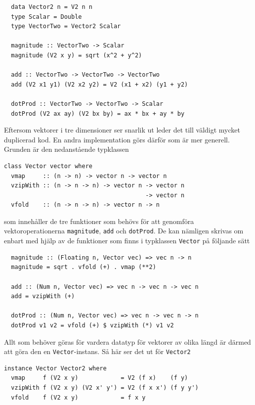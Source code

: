 \begin{lstlisting}
  data Vector2 n = V2 n n
  type Scalar = Double
  type VectorTwo = Vector2 Scalar
  
  magnitude :: VectorTwo -> Scalar
  magnitude (V2 x y) = sqrt (x^2 + y^2)
  
  add :: VectorTwo -> VectorTwo -> VectorTwo
  add (V2 x1 y1) (V2 x2 y2) = V2 (x1 + x2) (y1 + y2)

  dotProd :: VectorTwo -> VectorTwo -> Scalar
  dotProd (V2 ax ay) (V2 bx by) = ax * bx + ay * by
\end{lstlisting}

Eftersom vektorer i tre dimensioner ser snarlik ut leder det till väldigt mycket duplicerad kod. En andra implementation görs därför som är mer generell. Grunden är den nedanstående typklassen

\begin{lstlisting}
class Vector vector where
  vmap     :: (n -> n) -> vector n -> vector n
  vzipWith :: (n -> n -> n) -> vector n -> vector n 
                                        -> vector n
  vfold    :: (n -> n -> n) -> vector n -> n
\end{lstlisting}

som innehåller de tre funktioner som behövs för att genomföra vektoroperationerna \texttt{magnitude}, \texttt{add} och \texttt{dotProd}. De kan nämligen skrivas om enbart med hjälp av de funktioner som finns i typklassen \texttt{Vector} på följande sätt

\begin{lstlisting}
  magnitude :: (Floating n, Vector vec) => vec n -> n
  magnitude = sqrt . vfold (+) . vmap (**2)

  add :: (Num n, Vector vec) => vec n -> vec n -> vec n
  add = vzipWith (+)

  dotProd :: (Num n, Vector vec) => vec n -> vec n -> n
  dotProd v1 v2 = vfold (+) $ vzipWith (*) v1 v2
\end{lstlisting}

Allt som behöver göras för vardera datatyp för vektorer av olika längd är därmed att göra den en \texttt{Vector}-instans. Så här ser det ut för \texttt{Vector2}

\begin{lstlisting}
instance Vector Vector2 where
  vmap     f (V2 x y)            = V2 (f x)    (f y)
  vzipWith f (V2 x y) (V2 x' y') = V2 (f x x') (f y y')
  vfold    f (V2 x y)            = f x y
\end{lstlisting}

